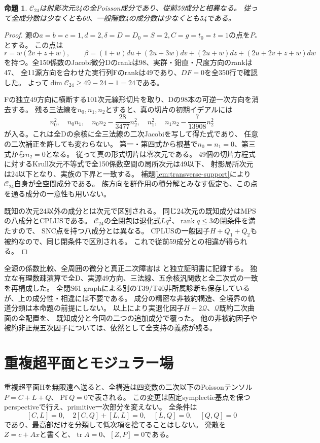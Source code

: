 \documentclass[a4paper,11pt]{ltjsarticle}
\newtheorem{proposition}{命題}[section]
\theoremstyle{definition}
\newcommand{\rank}{\operatorname{rank}}
\begin{document}
\begin{proposition}\label{prop:new24}
$\mathcal C_{24}$は射影次元24の全Poisson成分であり、従前59成分と相異なる。
従って全成分数は少なくとも60、一般階数4の成分数は少なくとも54である。
\end{proposition}
\begin{proof}
源の$a=b=c=1,d=2,\delta=D=D_0=S=2,C=g=t_0=t=1$の点を$P_*$とする。
この点は
\[
 r=w(2v+z+w),\qquad
 \beta=(1+u)du+(2u+3w)dv+(2u+w)dz+(2u+2v+z+w)dw
\]
を持つ。全150係数のJacobi微分Dのrankは98、実群・鉛直・尺度方向のrankは47、
全11源方向を合わせた実行列Fのrankは49であり、$DF=0$を全350行で確認した。
よって$\dim\mathcal C_{24}\ge49-24-1=24$である。

Fの独立49方向に横断する101次元線形切片を取り、Dの98本の可逆一次方向を消去する。
残る三法線を$n_0,n_1,n_2$とすると、真の切片の初期イデアルには
\[
 n_0^2,\quad n_0n_1,\quad n_0n_2-\frac{28}{3477}n_2^2,\quad
 n_1^2,\quad n_1n_2-\frac7{13908}n_2^2
\]
が入る。これは全Dの余核に全三法線の二次Jacobiを写して得た式であり、
任意の二次補正を許しても変わらない。
第一・第四式から根基で$n_0=n_1=0$、第三式から$n_2=0$となる。
従って真の形式切片は零次元である。
49個の切片方程式に対するKrull次元不等式で全150係数空間の局所次元は49以下、
射影局所次元は24以下となり、実族の下界と一致する。
補題\ref{lem:transverse-support}により$\mathcal C_{24}$自身が全空間成分である。
族方向を群作用の積分解とみなす仮定も、この点を通る成分の一意性も用いない。

既知の次元24以外の成分とは次元で区別される。
同じ24次元の既知成分はMPSの八成分とCPLUSである。
$\mathcal C_{24}$の全閉包は退化式$Lq^2$、$\rank q\le3$の閉条件を満たすので、
SNC点を持つ八成分とは異なる。
CPLUSの一般因子$H+Q_1+Q_2$も被約なので、同じ閉条件で区別される。
これで従前59成分との相違が得られる。
\end{proof}

全源の係数比較、全周囲の微分と真正二次障害は
と独立証明書に記録する。
独立な有理数疎演算で全D、実源49方向、三法線、五余核汎関数と全二次式の一致を再構成した。
全閉S61 graphによる別のT39/T40非所属診断も保存しているが、上の成分性・相違には不要である。
成分の精密な非被約構造、全境界の軌道分類は本命題の前提にしない。
以上により実退化因子$H+2\mathcal Q$、$\mathcal Q$既約二次曲面の全配置を、
既知成分と今回の二つの追加成分で覆った。
他の非被約因子や被約非正規五次因子については、依然として全支持の義務が残る。


\section{重複超平面とモジュラー場}
重複超平面Hを無限遠へ送ると、全構造は四変数の二次以下のPoissonテンソル
$P=C+L+Q$、$\operatorname{Pf}Q=0$で表される。
この変更は固定symplectic基点を保つperspectiveで行え、primitive一次部分を変えない。
全条件は
\[
 [C,L]=0,\quad 2[C,Q]+[L,L]=0,\quad [L,Q]=0,\quad[Q,Q]=0
\]
であり、最高部だけを分類して低次項を捨てることはしない。
発散を$Z=c+Ax$と書くと、$\operatorname{tr}A=0$、$[Z,P]=0$である。
\end{document}

